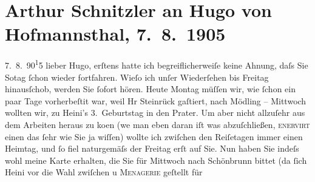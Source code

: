 

               \section[Arthur Schnitzler an Hugo von Hofmannsthal, 7. 8. 1905]{ Arthur Schnitzler an Hugo von Hofmannsthal, 7. 8. 1905}\nopagebreak{}\rehead{ }\begin{ledgroupsized}[t]{13cm}\normalsize\beginnumbering{} \toendnotes[C]{\smallbreak\pagebreak[2]} 
\toendnotes[C]{\smallbreak}\pstart
           \raggedleft{}{\pb}7. 8. 90\substVorne{}\textsuperscript{1}\substDazwischen{}5\substHinten{}\pend
           \pstart
           lieber Hugo, erſtens hatte ich begreiflicherweiſe keine Ahnung, daſs
               Sie So{\geminationn}tag{ }ſchon  wieder
               fortfahren. Wieſo ich unſer Wiederſehen bis Freitag hinausſchob, werden Sie ſofort
               hören. Heute Montag müſſen wir, wie ſchon ein paar Tage vorherbeſti{\geminationm}t war, weil Hr Steinrück gaſtiert, nach Mödling –
                  Mittwoch wollten {\pb}wir, zu Heini’s 3. Geburtstag in den Prater. Um aber nicht allzuſehr aus dem Arbeiten heraus zu ko{\geminationm}en (we{\geminationn} man eben daran iſt
               was abzuſchließen, \textsc{enervirt} einen das ſehr wie Sie ja
               wiſſen) wollte ich zwiſchen den Reiſetagen immer einen Heimtag, und ſo fiel
               naturgemäſs der Freitag erſt auf Sie. {\pb}Nun
               haben Sie indeſs wohl meine Karte erhalten, die Sie für Mittwoch nach
                  Schönbrunn bittet (da ſich Heini vor die Wahl zwiſchen \label{K_L01540_1v}\label{K_L01540_1h} u \textsc{Menagerie} geſtellt für

\end{ledgroupsized}
